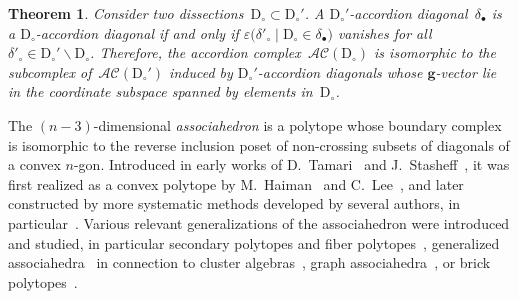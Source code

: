 \documentclass{amsart}
\newtheorem{theorem}{Theorem}%
\theoremstyle{definition}
\renewcommand{\b}[1]{\mathbf{#1}} %
\newcommand{\ssm}{\smallsetminus} %
\newcommand{\darkblue}{\color{darkblue}} %
\newcommand{\defn}[1]{\textsl{\darkblue #1}} %
\newcommand{\accordionComplex}{\mathcal{AC}} %
\newcommand{\dissection}{\mathrm{D}} %
\newcommand{\sign}[3]{\varepsilon \big( {#1}\;|\;{#2} \in {#3} \big)} %
\begin{document}
\begin{theorem}
\label{thm:deleteDiagonals}
Consider two dissections~$\dissection_\circ \subset \dissection_\circ'$. A $\dissection_\circ'$-accordion diagonal~$\delta_\bullet$ is a $\dissection_\circ$-accordion diagonal if and only if ${\sign{\delta'_\circ}{\dissection_\circ}{\delta_\bullet}}$ vanishes for all~$\delta'_\circ \in \dissection_\circ' \ssm \dissection_\circ$.
Therefore, the accordion complex~$\accordionComplex(\dissection_\circ)$ is isomorphic to the subcomplex of~$\accordionComplex(\dissection_\circ')$ induced by $\dissection_\circ'$-accordion diagonals whose $\b{g}$-vector lie in the coordinate subspace spanned by elements in~$\dissection_\circ$.
\end{theorem}


\newpage

\maketitle

The $(n-3)$-dimensional \defn{associahedron} is a polytope whose boundary complex is isomorphic to the reverse inclusion poset of non-crossing subsets of diagonals of a convex $n$-gon. Introduced in early works of D.~Tamari~\cite{Tamari} and \mbox{J.~Stasheff~\cite{Stasheff}}, it was first realized as a convex polytope by M.~Haiman~\cite{Haiman} and C.~Lee~\cite{Lee}, and later constructed by more systematic methods developed by several authors, in particular~\cite{GelfandKapranovZelevinsky, Loday, HohlwegLange, CeballosSantosZiegler}. Various relevant generalizations of the associahedron were introduced and studied, in particular secondary polytopes and fiber polytopes~\cite{GelfandKapranovZelevinsky, BilleraFillimanSturmfels}, generalized associahedra~\cite{FominZelevinsky-YSystems, ChapotonFominZelevinsky, HohlwegLangeThomas, Stella, Hohlweg} in connection to cluster algebras~\cite{FominZelevinsky-ClusterAlgebrasI, FominZelevinsky-ClusterAlgebrasII}, graph associahedra~\cite{CarrDevadoss, Postnikov, FeichtnerSturmfels, Zelevinsky, Pilaud-signedTreeAssociahedra, MannevillePilaud-compatibilityFansGraphAssociahedra}, or brick polytopes~\cite{PilaudSantos-brickPolytope, PilaudStump-brickPolytope}.
\end{document}
